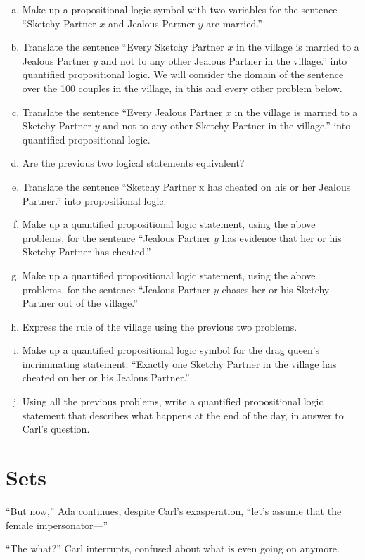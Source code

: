 \documentclass{article}
\begin{document}
\begin{enumerate}[(a)]
\item
Make up a propositional logic symbol with two variables
for the sentence ``Sketchy Partner $x$ and Jealous Partner $y$ are married.''
\item
Translate the sentence ``Every Sketchy Partner $x$ in the village is
married to a Jealous Partner $y$ and not to any other Jealous Partner in the village.''
into quantified propositional logic.
We will consider the domain of the sentence over the 100
couples in the village, in this and every other problem below.
\item
Translate the sentence ``Every Jealous Partner $x$ in the village is
married to a Sketchy Partner $y$ and not to any other Sketchy Partner in the village.''
into quantified propositional logic.
\item
Are the previous two logical statements equivalent?
\item
Translate the sentence ``Sketchy Partner x has cheated on his or her Jealous Partner.''
into propositional logic.
\item
Make up a quantified propositional logic statement, using the above
problems,
for the sentence ``Jealous Partner $y$ has evidence that her or his Sketchy Partner has cheated.''
\item
Make up a quantified propositional logic statement, using the above
problems,
for the sentence ``Jealous Partner $y$ chases her or his Sketchy Partner out of the village.''
\item
Express the rule of the village using the previous two problems.
\item
Make up a quantified propositional logic symbol for
the drag queen's incriminating statement:
``Exactly one Sketchy Partner in the
village has cheated on her or his Jealous Partner.''
\item
Using all the previous problems,
write a quantified propositional logic statement that describes
what happens at the end of the day, in answer to Carl's question.
\end{enumerate}

\section{Sets}

``But now,'' Ada continues, despite Carl's exasperation,
``let's assume that the female impersonator---''

``The what?'' Carl interrupts, confused about what is even going on anymore.
\end{document}

